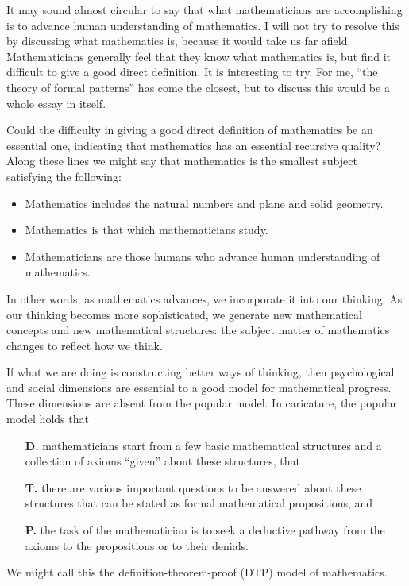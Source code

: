 \documentclass[12pt,oneside]{amsart}
\begin{document}
\bigskip

It may sound almost circular to say that what
mathematicians are accomplishing is
to advance human understanding of mathematics.
I will not try to resolve this by discussing what 
mathematics is,
because it would take us far afield. Mathematicians 
generally feel that
they know what mathematics is, but find it difficult to 
give a good direct
definition. It is interesting to try. For me, ``the theory 
of formal
patterns'' has come the closest, but to discuss this would 
be a whole essay in
itself.

Could the difficulty in giving a good direct definition of 
mathematics
be an essential one, indicating that mathematics has an 
essential
recursive quality? Along these lines we might say that 
mathematics
is the smallest subject satisfying the following:
\begin{itemize}
\item Mathematics includes the natural numbers and plane 
and solid geometry.
\item Mathematics is that which mathematicians study.
\item Mathematicians are those humans who advance human 
understanding of
mathematics.
\end{itemize}
In other words, as mathematics advances, we incorporate it 
into our thinking.
As our thinking becomes more sophisticated, we generate 
new mathematical
concepts and new mathematical structures: the subject 
matter of
mathematics changes to reflect how we think.

\medskip
If what we are doing is constructing better ways of 
thinking, then
psychological and social dimensions are essential to a 
good model
for mathematical progress.  These dimensions are absent 
from the popular
model.  In caricature, the popular model
holds that
\begin{itemize}
\item[\bf D.]
 mathematicians start from a few basic mathematical 
structures
and a collection of axioms ``given'' about these 
structures, that 
\item[\bf T.]
there are various important questions 
to be answered about these structures that can be stated 
as formal mathematical
propositions, and
\item[\bf P.]
the task of the 
mathematician is to seek a deductive pathway from the 
axioms to 
the propositions or to their denials.
\end{itemize}
 We might call this the
definition-theorem-proof (DTP) model of mathematics.
\end{document}

